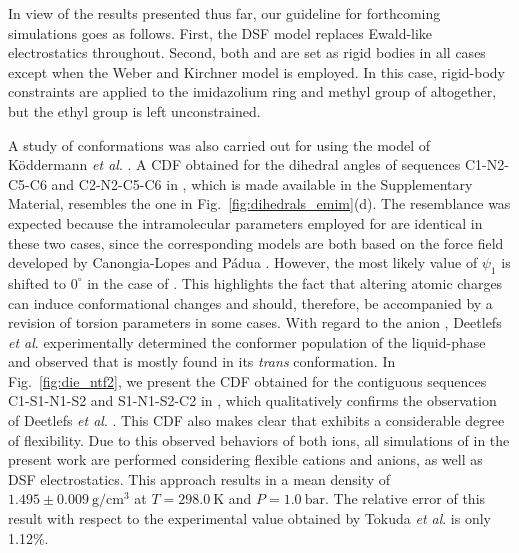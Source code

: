 \documentclass[3p,twocolumn]{elsarticle}
\providecommand{\DIFadd}[1]{{\protect\color{blue}\uwave{#1}}} %
\providecommand{\DIFdel}[1]{{\protect\color{red}\sout{#1}}}                      %
\providecommand{\DIFaddbegin}{} %
\providecommand{\DIFaddend}{} %
\providecommand{\DIFdelbegin}{} %
\providecommand{\DIFdelend}{} %
\newcommand{\DIFscaledelfig}{0.5}
\newlength{\DIFdelgraphicswidth} %
\newlength{\DIFdelgraphicsheight} %
\newcommand{\DIFaddincludegraphics}[2][]{{\color{blue}\fbox{\DIFOincludegraphics[#1]{#2}}}} %
\newcommand{\DIFdelincludegraphics}[2][]{%
\sbox{\DIFdelgraphicsbox}{\DIFOincludegraphics[#1]{#2}}%
\settoboxwidth{\DIFdelgraphicswidth}{\DIFdelgraphicsbox} %
\settoboxtotalheight{\DIFdelgraphicsheight}{\DIFdelgraphicsbox} %
\scalebox{\DIFscaledelfig}{%
\parbox[b]{\DIFdelgraphicswidth}{\usebox{\DIFdelgraphicsbox}\\[-\baselineskip] \rule{\DIFdelgraphicswidth}{0em}}\llap{\resizebox{\DIFdelgraphicswidth}{\DIFdelgraphicsheight}{%
\setlength{\unitlength}{\DIFdelgraphicswidth}%
\begin{picture}(1,1)%
\thicklines\linethickness{2pt} %
{\color[rgb]{1,0,0}\put(0,0){\framebox(1,1){}}}%
{\color[rgb]{1,0,0}\put(0,0){\line( 1,1){1}}}%
{\color[rgb]{1,0,0}\put(0,1){\line(1,-1){1}}}%
\end{picture}%
}\hspace*{3pt}}} %
} %
\DeclareRobustCommand{\DIFaddbegin}{\DIFOaddbegin \let\includegraphics\DIFaddincludegraphics} %
\DeclareRobustCommand{\DIFaddend}{\DIFOaddend \let\includegraphics\DIFOincludegraphics} %
\DeclareRobustCommand{\DIFdelbegin}{\DIFOdelbegin \let\includegraphics\DIFdelincludegraphics} %
\DeclareRobustCommand{\DIFdelend}{\DIFOaddend \let\includegraphics\DIFOincludegraphics} %
\begin{document}
In view of the results presented thus far, our guideline for forthcoming \ce{[emim][B(CN)_4]} simulations goes as follows.
First, the DSF model replaces Ewald-like electrostatics throughout.
Second, both \ce{[emim]^+} and \ce{[B(CN)_4]^-} are set as rigid bodies in all cases except when the Weber and Kirchner \cite{Weber_2016} model is employed.
In this case, rigid-body constraints are applied to the imidazolium ring and methyl group of \ce{[emim]^+} altogether, but the ethyl group is left unconstrained.

A study of conformations was also carried out for \ce{[emim][NTf_2]} using the model of K\"{o}ddermann \textit{et al}. \cite{Koddermann_2007}.
A CDF obtained for the dihedral angles of sequences C1-N2-C5-C6 and C2-N2-C5-C6 in \ce{[emim]^+}, which is made available in the Supplementary Material, resembles the one in Fig.~\ref{fig:dihedrals_emim}(d).
The resemblance was expected because the intramolecular parameters employed for \ce{[emim]^+} are identical in these two cases, since the corresponding models are both based on the force field developed by Canongia-Lopes and P\'{a}dua \cite{Canongia_Lopes_2006}.
However, the most likely value of $\psi_1$ is shifted to $0^{\circ}$ in the case of \ce{[emim][NTf_2]}.
This highlights the fact that altering atomic charges can induce conformational changes and should, therefore, be accompanied by a revision of torsion parameters in some cases.
With regard to the anion \ce{[NTf_2]^-}, Deetlefs \textit{et al}. \cite{Deetlefs_2006} experimentally determined the conformer population of the liquid-phase and observed that \ce{[NTf_2]^-} is mostly found in its \textit{trans} conformation.
In Fig.~\ref{fig:die_ntf2}, we present the CDF obtained for the contiguous sequences C1-S1-N1-S2 and S1-N1-S2-C2 in \ce{[NTf_2]^-}, which qualitatively confirms the observation of Deetlefs \textit{et al}. \cite{Deetlefs_2006}.
This CDF also makes clear that \ce{[NTf_2]^-} exhibits a considerable degree of flexibility.
Due to this observed behaviors of both ions, all simulations of \ce{[emim][NTf_2]} in the present work are performed considering flexible cations and anions, as well as DSF electrostatics.
This approach results in a mean density of $1.495 \pm 0.009 ~\mathrm{g/cm^3}$ at $T = 298.0~\mathrm{K}$ and \DIFdelbegin \DIFdel{$P = 1.0~\mathrm{bar}$}\DIFdelend \DIFaddbegin \DIFadd{$p = 0.1~\mathrm{MPa}$}\DIFaddend .
The relative error of this result with respect to the experimental value obtained by Tokuda \textit{et al}. \cite{Tokuda_2005} is only 1.12\%.
\end{document}
